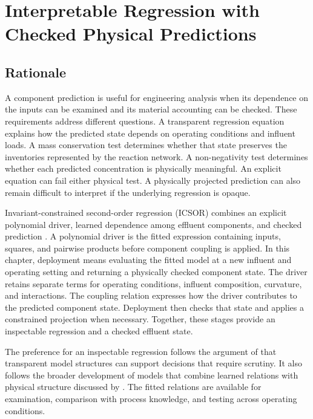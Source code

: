 \chapter{Interpretable Regression with Checked Physical Predictions}
\label{ch:interpretable}

\section{Rationale}

A component prediction is useful for engineering analysis when its dependence on the inputs can be examined and its material accounting can be checked. These requirements address different questions. A transparent regression equation explains how the predicted state depends on operating conditions and influent loads. A mass conservation test determines whether that state preserves the inventories represented by the reaction network. A non-negativity test determines whether each predicted concentration is physically meaningful. An explicit equation can fail either physical test. A physically projected prediction can also remain difficult to interpret if the underlying regression is opaque.

Invariant-constrained second-order regression (ICSOR) combines an explicit polynomial driver, learned dependence among effluent components, and checked prediction \citep{Selerio2026}. A polynomial driver is the fitted expression containing inputs, squares, and pairwise products before component coupling is applied. In this chapter, deployment means evaluating the fitted model at a new influent and operating setting and returning a physically checked component state. The driver retains separate terms for operating conditions, influent composition, curvature, and interactions. The coupling relation expresses how the driver contributes to the predicted component state. Deployment then checks that state and applies a constrained projection when necessary. Together, these stages provide an inspectable regression and a checked effluent state.

The preference for an inspectable regression follows the argument of \citet{Rudin2019} that transparent model structures can support decisions that require scrutiny. It also follows the broader development of models that combine learned relations with physical structure discussed by \citet{Shen2023}. The fitted relations are available for examination, comparison with process knowledge, and testing across operating conditions.

